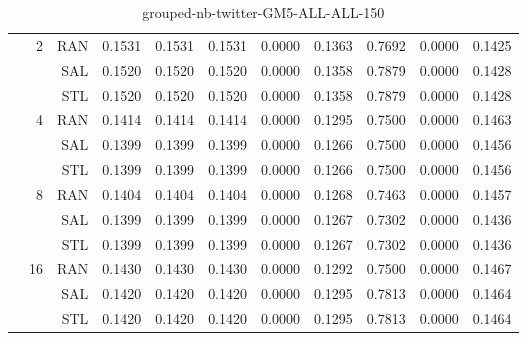 \begin{center}
\begin{table}[htbp]
\begin{tabular}{ | r | r | r | r | r | r | r | r | r | r | r |}
 & \multirow{3}{*}{2} & RAN & 0.1531 & 0.1531 & 0.1531 & 0.0000 & 0.1363 & 0.7692 & 0.0000 & 0.1425\\ \cline{3-11}
 &   & SAL & 0.1520 & 0.1520 & 0.1520 & 0.0000 & 0.1358 & 0.7879 & 0.0000 & 0.1428\\ \cline{3-11}
 &   & STL & 0.1520 & 0.1520 & 0.1520 & 0.0000 & 0.1358 & 0.7879 & 0.0000 & 0.1428\\ \cline{2-11}
 & \multirow{3}{*}{4} & RAN & 0.1414 & 0.1414 & 0.1414 & 0.0000 & 0.1295 & 0.7500 & 0.0000 & 0.1463\\ \cline{3-11}
 &   & SAL & 0.1399 & 0.1399 & 0.1399 & 0.0000 & 0.1266 & 0.7500 & 0.0000 & 0.1456\\ \cline{3-11}
 &   & STL & 0.1399 & 0.1399 & 0.1399 & 0.0000 & 0.1266 & 0.7500 & 0.0000 & 0.1456\\ \cline{2-11}
 & \multirow{3}{*}{8} & RAN & 0.1404 & 0.1404 & 0.1404 & 0.0000 & 0.1268 & 0.7463 & 0.0000 & 0.1457\\ \cline{3-11}
 &   & SAL & 0.1399 & 0.1399 & 0.1399 & 0.0000 & 0.1267 & 0.7302 & 0.0000 & 0.1436\\ \cline{3-11}
 &   & STL & 0.1399 & 0.1399 & 0.1399 & 0.0000 & 0.1267 & 0.7302 & 0.0000 & 0.1436\\ \cline{2-11}
 & \multirow{3}{*}{16} & RAN & 0.1430 & 0.1430 & 0.1430 & 0.0000 & 0.1292 & 0.7500 & 0.0000 & 0.1467\\ \cline{3-11}
 &   & SAL & 0.1420 & 0.1420 & 0.1420 & 0.0000 & 0.1295 & 0.7813 & 0.0000 & 0.1464\\ \cline{3-11}
 &   & STL & 0.1420 & 0.1420 & 0.1420 & 0.0000 & 0.1295 & 0.7813 & 0.0000 & 0.1464\\ \cline{2-11}
\hline
\end{tabular}
\caption{grouped-nb-twitter-GM5-ALL-ALL-150}
\end{table}
\end{center}


